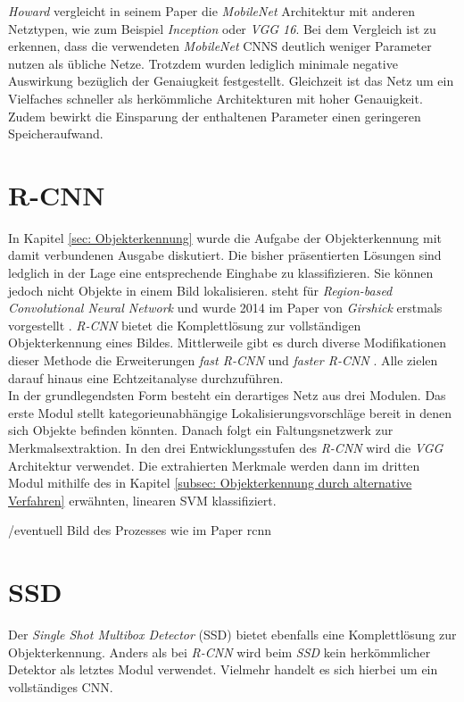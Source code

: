		\textit{Howard} vergleicht in seinem Paper die \textit{MobileNet} Architektur mit anderen Netztypen, wie zum Beispiel \textit{Inception} oder \textit{VGG 16}. Bei dem Vergleich ist zu erkennen, dass die verwendeten \textit{MobileNet} CNNS deutlich weniger Parameter nutzen als übliche Netze. Trotzdem wurden lediglich minimale negative Auswirkung bezüglich der Genaiugkeit festgestellt. Gleichzeit ist das Netz um ein Vielfaches schneller als herkömmliche Architekturen mit hoher Genauigkeit. Zudem bewirkt die Einsparung der enthaltenen Parameter einen geringeren Speicheraufwand.
		
	
		\section*{R-CNN}
		
		In Kapitel \ref{sec: Objekterkennung} wurde die Aufgabe der Objekterkennung mit damit verbundenen Ausgabe diskutiert. Die bisher präsentierten Lösungen sind ledglich in der Lage eine entsprechende Einghabe zu klassifizieren. Sie können jedoch nicht Objekte in einem Bild lokalisieren.  steht für \textit{Region-based Convolutional Neural Network} und wurde 2014 im Paper von \textit{Girshick} erstmals vorgestellt \cite{rcnn}. \textit{R-CNN} bietet die Komplettlösung zur vollständigen Objekterkennung eines Bildes. Mittlerweile gibt es durch diverse Modifikationen dieser Methode die Erweiterungen \textit{fast R-CNN} und \textit{faster R-CNN} \cite{fastrcnn} \cite{fasterrcnn}. Alle zielen darauf hinaus eine Echtzeitanalyse durchzuführen.\\
		
		In der grundlegendsten Form besteht ein derartiges Netz aus drei Modulen. Das erste Modul stellt kategorieunabhängige Lokalisierungsvorschläge bereit in denen sich Objekte befinden könnten. Danach folgt ein Faltungsnetzwerk zur Merkmalsextraktion. In den drei Entwicklungsstufen des \textit{R-CNN} wird die \textit{VGG} Architektur verwendet. Die extrahierten Merkmale werden dann im dritten Modul mithilfe des in Kapitel \ref{subsec: Objekterkennung durch alternative Verfahren} erwähnten, linearen SVM klassifiziert.
		
		/eventuell Bild des Prozesses wie im Paper rcnn
		
		\section*{SSD}
		
		Der \textit{Single Shot Multibox Detector} (SSD) bietet ebenfalls eine Komplettlösung zur Objekterkennung. Anders als bei \textit{R-CNN} wird beim \textit{SSD} kein herkömmlicher Detektor als letztes Modul verwendet. Vielmehr handelt es sich hierbei um ein vollständiges CNN.\\
		
